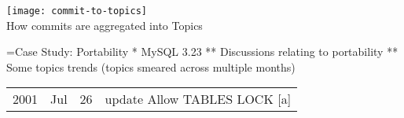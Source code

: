 \documentclass[titlepage,usenames,a4,landscape,semhelv]{seminar}
\begin{document}
\begin{slide}



\newslide

\begin{specquotei}
\begin{center}
\noindent
\texttt{[image: commit-to-topics]} \\
{How commits are aggregated into Topics}
\end{center}
\end{specquotei}

=Case Study: Portability
* MySQL 3.23 
** Discussions relating to portability
** Some topics trends (topics smeared across multiple months)


\newslide

\begin{specquotef}
\centering
\begin{tabular}{|ccc|l|}

\hline
2001 &  Jul &  26 &    update Allow TABLES LOCK [a] \\ 


\end{tabular}
\end{specquotef}
\end{slide}
\end{document}

